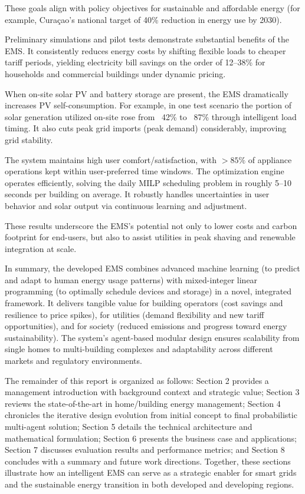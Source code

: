 \documentclass[12pt,a4paper]{article}
\begin{document}
These goals align with policy objectives for sustainable and affordable energy (for example, Curaçao's national target of 40\% reduction in energy use by 2030). 

Preliminary simulations and pilot tests demonstrate substantial benefits of the EMS. It consistently reduces energy costs by shifting flexible loads to cheaper tariff periods, yielding electricity bill savings on the order of 12–38\% for households and commercial buildings under dynamic pricing. 

When on-site solar PV and battery storage are present, the EMS dramatically increases PV self-consumption. For example, in one test scenario the portion of solar generation utilized on-site rose from ~42\% to ~87\% through intelligent load timing. It also cuts peak grid imports (peak demand) considerably, improving grid stability.

The system maintains high user comfort/satisfaction, with $>85\%$ of appliance operations kept within user-preferred time windows. The optimization engine operates efficiently, solving the daily MILP scheduling problem in roughly 5–10 seconds per building on average. It robustly handles uncertainties in user behavior and solar output via continuous learning and adjustment. 

These results underscore the EMS's potential not only to lower costs and carbon footprint for end-users, but also to assist utilities in peak shaving and renewable integration at scale. 

In summary, the developed EMS combines advanced machine learning (to predict and adapt to human energy usage patterns) with mixed-integer linear programming (to optimally schedule devices and storage) in a novel, integrated framework. It delivers tangible value for building operators (cost savings and resilience to price spikes), for utilities (demand flexibility and new tariff opportunities), and for society (reduced emissions and progress toward energy sustainability). The system's agent-based modular design ensures scalability from single homes to multi-building complexes and adaptability across different markets and regulatory environments.

The remainder of this report is organized as follows: Section 2 provides a management introduction with background context and strategic value; Section 3 reviews the state-of-the-art in home/building energy management; Section 4 chronicles the iterative design evolution from initial concept to final probabilistic multi-agent solution; Section 5 details the technical architecture and mathematical formulation; Section 6 presents the business case and applications; Section 7 discusses evaluation results and performance metrics; and Section 8 concludes with a summary and future work directions. Together, these sections illustrate how an intelligent EMS can serve as a strategic enabler for smart grids and the sustainable energy transition in both developed and developing regions.
\end{document}

